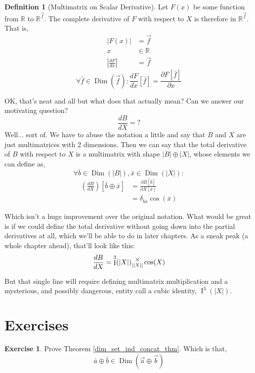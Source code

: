 \documentclass[12pt]{book}
\theoremstyle{plain}
\theoremstyle{definition}
\newtheorem{definition}{Definition}[chapter]
\newtheorem{exercise}{Exercise}[chapter]
\theoremstyle{ppart}
\theoremstyle{case}
\theoremstyle{solution}
\DeclareMathOperator{\Dim}{Dim}
\DeclareMathOperator{\Ident}{I}
\newcommand{\mmult}[1]{\text{\raisebox{1ex}{$\underset{#1}{\times}$}}}
\newcommand{\shape}[1]{\left|#1\right|}
\begin{document}
\begin{definition}[Multimatrix on Scalar Derivative]
\label{ms_derivative}
Let $F(x)$ be some function from $\mathbb{R}$ to $\mathbb{R}^{\vec{f}}$.
The complete derivative of $F$ with respect to $X$ is therefore in
$\mathbb{R}^{\vec{f}}$. That is,
\begin{align*}
\shape{F(x)} &= \vec{f} \\
x &\in \mathbb{R} \\
\shape{\frac{dF}{dx}} &= \vec{f}
\end{align*}
\[
\forall \bar{f} \in \Dim(\vec{f}):
        \frac{dF}{dx}[\bar{f}] =
        \frac{\partial F[\bar{f}]}{\partial x}
\]
\end{definition}

OK, that's neat and all but what does that actually mean? Can we answer our motivating 
question?
\[\frac{dB}{dX} = ? \]
Well... sort of. We have to abuse the notation a little and say that $B$ and $X$ are
just multimatrices with 2 dimensions. Then we can say that the total derivative
of $B$ with respect to $X$ is a multimatrix with shape $\shape{B} \oplus \shape{X}$,
whose elements we can define as,
\[\forall \bar{b} \in \Dim(\shape{B}), \bar{x} \in \Dim(\shape{X}):\]
\begin{align*}
\left( \frac{dB}{dX} \right)[\bar{b} \oplus \bar{x}]
&= \frac{\partial B[\bar{b}]}{\partial X[\bar{x}]} \\
&= \delta_{\bar{b}\bar{x}}\cos(\bar{x})
\end{align*}

Which isn't a huge improvement over the original notation. What would be great is
if we could define the total derivative without going down into the partial derivatives
at all, which we'll be able to do in later chapters. As a sneak peak (a whole
chapter ahead), that'll look like this:
\[
\frac{dB}{dX} = \Ident^3(\shape{X}) \mmult{\shape{\shape{X}}} \cos(X)
\]

But that single line will require defining multimatrix multiplication and
a mysterious, and possibly dangerous, entity call a cubic identity, $\Ident^3(\shape{X})$.

\section{Exercises}

\begin{exercise}
\label{dim_set_ind_concat_ex}
Prove Theorem \ref{dim_set_ind_concat_thm}. Which is that,
\[ \bar{a} \oplus \bar{b} \in \Dim(\vec{a} \oplus \vec{b}) \]
\end{exercise}
\end{document}
